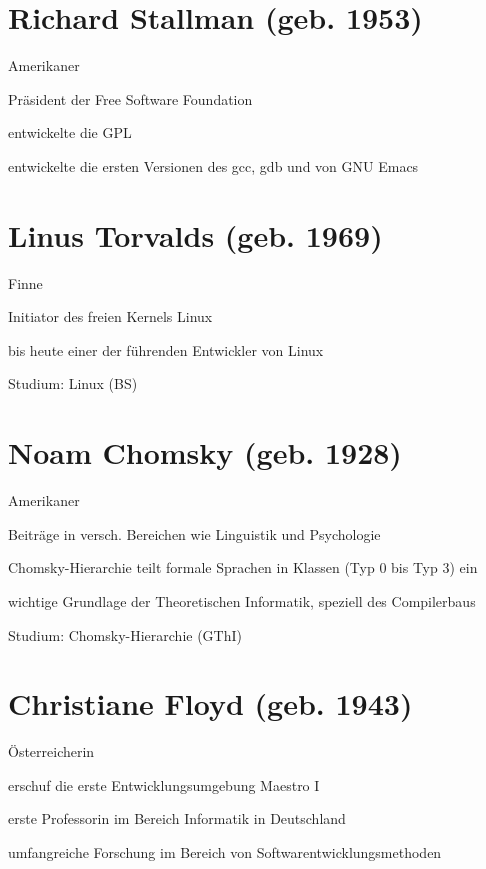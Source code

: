 \documentclass[a4paper,12pt]{report}
\begin{document}
\section{Richard Stallman (geb. 1953)}
\begin{itemize*}
\item Amerikaner
\item Präsident der Free Software Foundation
\item entwickelte die GPL
\item entwickelte die ersten Versionen des gcc, gdb und von GNU Emacs
\end{itemize*}

\section{Linus Torvalds (geb. 1969)}
\begin{itemize*}
\item Finne
\item Initiator des freien Kernels Linux
\item bis heute einer der führenden Entwickler von Linux
\item Studium: Linux (BS)
\end{itemize*}

\section{Noam Chomsky (geb. 1928)}
\begin{itemize*}
\item Amerikaner
\item Beiträge in versch. Bereichen wie Linguistik und Psychologie
\item Chomsky-Hierarchie teilt formale Sprachen in Klassen (Typ 0 bis Typ 3) ein
\item wichtige Grundlage der Theoretischen Informatik, speziell des Compilerbaus
\item Studium: Chomsky-Hierarchie (GThI)
\end{itemize*}

\section{Christiane Floyd (geb. 1943)}
\begin{itemize*}
\item Österreicherin
\item erschuf die erste Entwicklungsumgebung Maestro I
\item erste Professorin im Bereich Informatik in Deutschland
\item umfangreiche Forschung im Bereich von Softwarentwicklungsmethoden
\end{itemize*}
\end{document}
